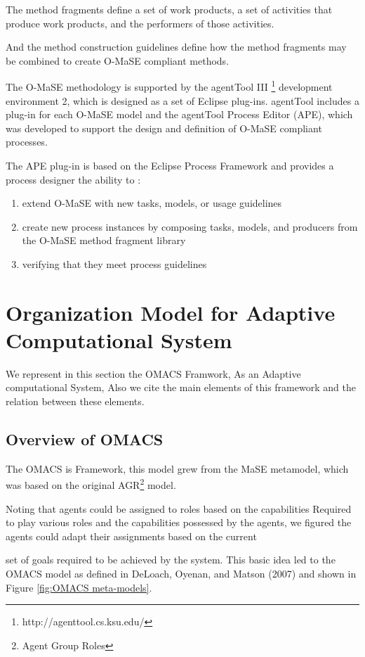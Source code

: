The method fragments define a set of work products, a set of activities that produce work products, and the performers of those activities.

And the method construction guidelines define how the method fragments may be
combined to create O-MaSE compliant methods.

The O-MaSE methodology is supported by the agentTool III \footnote{http://agenttool.cs.ksu.edu/}
 development environment 2, 
which is designed as a set of Eclipse plug-ins. agentTool includes a plug-in for each O-MaSE model 
and the agentTool Process Editor (APE), which was developed to support the design and definition 
of O-MaSE compliant processes\cite{omacs7}.

The APE plug-in is based on the Eclipse Process Framework and provides a process designer the ability to : 
\begin{enumerate}
\item 
	extend O-MaSE with new tasks, models, or usage guidelines
\item
	create new process instances by composing tasks, models, and producers from the O-MaSE method fragment library  
\item
	 verifying that they meet process guidelines
\end{enumerate} 
 
\section{Organization Model for Adaptive Computational System}
We represent in this section the OMACS Framwork, As an Adaptive computational System, Also we cite the main elements of this framework and the relation between these elements.
\subsection{Overview of OMACS}
The OMACS is Framework, this model grew from the MaSE metamodel, 
which was based on the original AGR\footnote{Agent Group Roles}  model\cite{omacs4}.
 
Noting that agents could be assigned to roles based on the capabilities 
Required to play various roles and the capabilities possessed by the agents,
we figured the agents could adapt their assignments based on the current 


set of goals required to be achieved by the system.
This basic idea led to the OMACS  model as defined in DeLoach,
Oyenan, and Matson (2007) and shown in Figure \ref{fig:OMACS meta-models}\cite{omacs4}.

